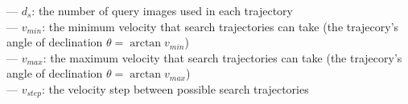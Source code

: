 \parbox{\textwidth}{--- $d_s$: the number of query images used in each trajectory \\ --- $v_{min}$: the minimum velocity that search trajectories can take (the trajecory's angle of declination $\theta=\arctan{v_{min}}$) \\ --- $v_{max}$: the maximum velocity that search trajectories can take (the trajecory's angle of declination $\theta=\arctan{v_{max}}$) \\ --- $v_{step}$: the velocity step between possible search trajectories}
\smallskip
